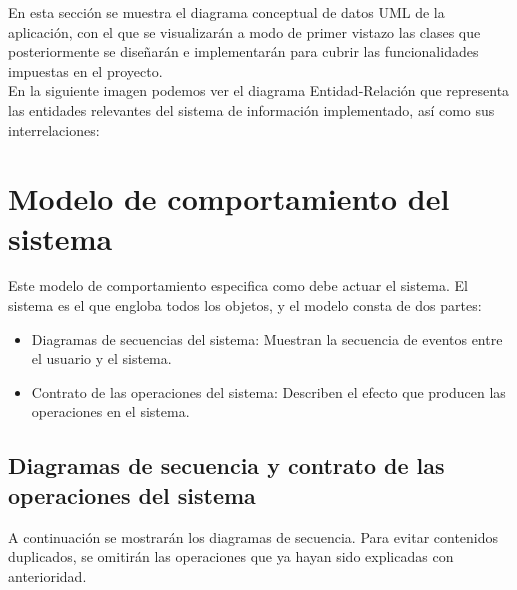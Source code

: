 En esta sección se muestra el diagrama conceptual de datos UML de la aplicación, con el que se visualizarán a modo de primer vistazo las clases que posteriormente se diseñarán e implementarán para cubrir las funcionalidades impuestas en el proyecto.\\

En la siguiente imagen podemos ver el diagrama Entidad-Relación que representa las entidades relevantes del sistema de información implementado, así como sus interrelaciones:


\section{Modelo de comportamiento del sistema}

Este modelo de comportamiento especifica como debe actuar el sistema. El sistema es el que engloba todos los objetos, y el modelo consta de dos partes:

\begin{itemize}
\item Diagramas de secuencias del sistema: Muestran la secuencia de eventos entre el usuario y el sistema.
\item Contrato de las operaciones del sistema: Describen el efecto que producen las operaciones en el sistema.
\end{itemize}

\subsection{Diagramas de secuencia y contrato de las operaciones del sistema}

A continuación se mostrarán los diagramas de secuencia. Para evitar contenidos duplicados, se omitirán las operaciones que ya hayan sido explicadas con anterioridad.















